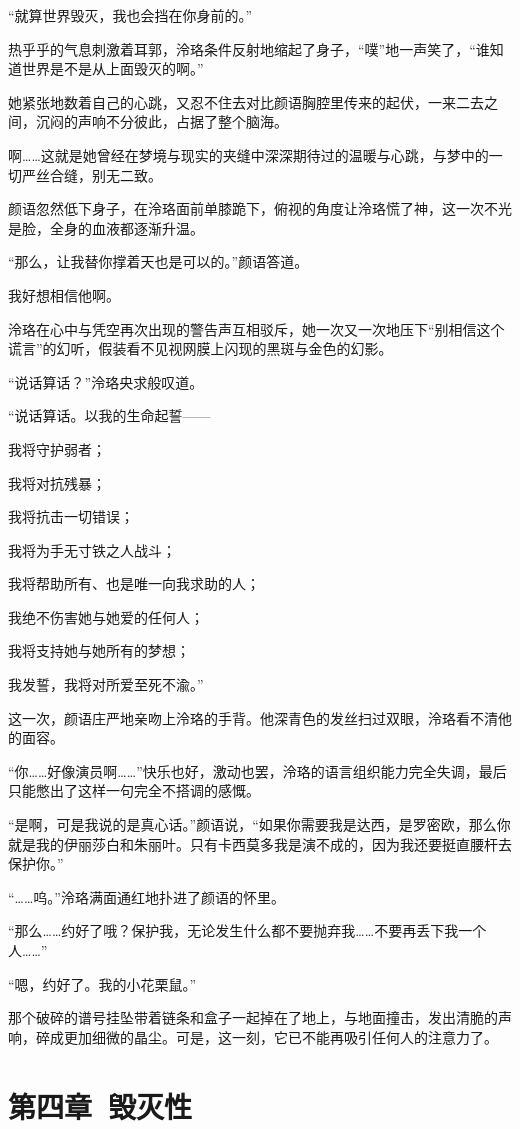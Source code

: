 \documentclass[UTF8, scheme = chinese, openany]{ctexbook}
\begin{document}
“就算世界毁灭，我也会挡在你身前的。”

热乎乎的气息刺激着耳郭，泠珞条件反射地缩起了身子，“噗”地一声笑了，“谁知道世界是不是从上面毁灭的啊。”

她紧张地数着自己的心跳，又忍不住去对比颜语胸腔里传来的起伏，一来二去之间，沉闷的声响不分彼此，占据了整个脑海。

啊……这就是她曾经在梦境与现实的夹缝中深深期待过的温暖与心跳，与梦中的一切严丝合缝，别无二致。

颜语忽然低下身子，在泠珞面前单膝跪下，俯视的角度让泠珞慌了神，这一次不光是脸，全身的血液都逐渐升温。

“那么，让我替你撑着天也是可以的。”颜语答道。

我好想相信他啊。

泠珞在心中与凭空再次出现的警告声互相驳斥，她一次又一次地压下“别相信这个谎言”的幻听，假装看不见视网膜上闪现的黑斑与金色的幻影。

“说话算话？”泠珞央求般叹道。

“说话算话。以我的生命起誓——

我将守护弱者；

我将对抗残暴；

我将抗击一切错误；

我将为手无寸铁之人战斗；

我将帮助所有、也是唯一向我求助的人；

我绝不伤害她与她爱的任何人；

我将支持她与她所有的梦想；

我发誓，我将对所爱至死不渝。”

这一次，颜语庄严地亲吻上泠珞的手背。他深青色的发丝扫过双眼，泠珞看不清他的面容。

“你……好像演员啊……”快乐也好，激动也罢，泠珞的语言组织能力完全失调，最后只能憋出了这样一句完全不搭调的感慨。

“是啊，可是我说的是真心话。”颜语说，“如果你需要我是达西，是罗密欧，那么你就是我的伊丽莎白和朱丽叶。只有卡西莫多我是演不成的，因为我还要挺直腰杆去保护你。”

“……呜。”泠珞满面通红地扑进了颜语的怀里。

“那么……约好了哦？保护我，无论发生什么都不要抛弃我……不要再丢下我一个人……”

“嗯，约好了。我的小花栗鼠。”

那个破碎的谱号挂坠带着链条和盒子一起掉在了地上，与地面撞击，发出清脆的声响，碎成更加细微的晶尘。可是，这一刻，它已不能再吸引任何人的注意力了。

\chapter{第四章\ 毁灭性}
\end{document}
